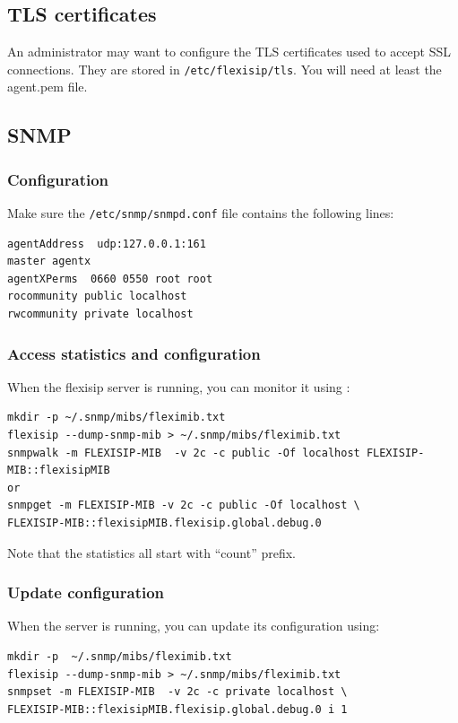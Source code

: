 \documentclass[a4paper,10pt]{article}
\begin{document}
\subsection{TLS certificates}
An administrator may want to configure the TLS certificates used to accept SSL connections.
They are stored in \verb|/etc/flexisip/tls|. You will need at least the agent.pem file.

\subsection{SNMP}
\subsubsection{Configuration}
Make sure the \verb|/etc/snmp/snmpd.conf| file contains the following lines:
\begin{verbatim}
agentAddress  udp:127.0.0.1:161
master agentx
agentXPerms  0660 0550 root root
rocommunity public localhost
rwcommunity private localhost
\end{verbatim}




\subsubsection{Access statistics and configuration}
When the flexisip server is running, you can monitor it using :
\begin{verbatim}
mkdir -p ~/.snmp/mibs/fleximib.txt
flexisip --dump-snmp-mib > ~/.snmp/mibs/fleximib.txt
snmpwalk -m FLEXISIP-MIB  -v 2c -c public -Of localhost FLEXISIP-MIB::flexisipMIB
or
snmpget -m FLEXISIP-MIB -v 2c -c public -Of localhost \
FLEXISIP-MIB::flexisipMIB.flexisip.global.debug.0
\end{verbatim}

Note that the statistics all start with “count” prefix.


\subsubsection{Update configuration}
When the server is running, you can update its configuration using:
\begin{verbatim}
mkdir -p  ~/.snmp/mibs/fleximib.txt
flexisip --dump-snmp-mib > ~/.snmp/mibs/fleximib.txt
snmpset -m FLEXISIP-MIB  -v 2c -c private localhost \
FLEXISIP-MIB::flexisipMIB.flexisip.global.debug.0 i 1
\end{verbatim}
\end{document}
